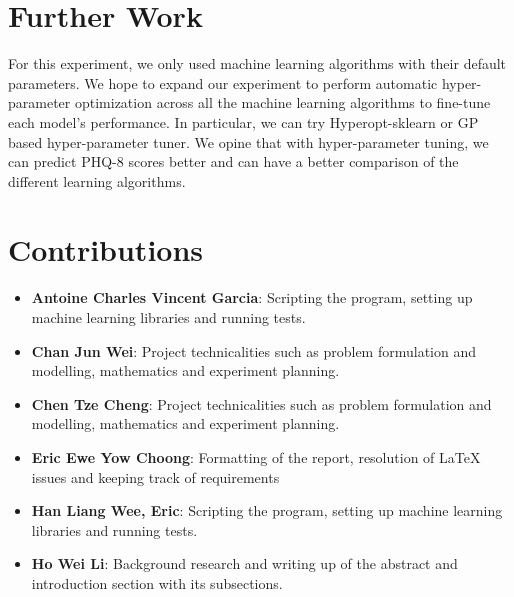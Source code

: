 \documentclass{article}
\begin{document}
	\section{Further Work}
	For this experiment, we only used machine learning algorithms with their default parameters. 
	We hope to expand our experiment to perform automatic hyper-parameter optimization across all the machine learning algorithms to fine-tune each model's performance. 
	In particular, we can try Hyperopt-sklearn \cite{Komer2014HyperoptsklearnAH} or GP based hyper-parameter tuner. 
	We opine that with hyper-parameter tuning, we can predict PHQ-8 scores better and can have a better comparison of the different learning algorithms.
	
	\section{Contributions}
	\begin{itemize}
		\item \textbf{Antoine Charles Vincent Garcia}: 
		Scripting the program, setting up machine learning libraries and running tests.
		\item \textbf{Chan Jun Wei}: 
		Project technicalities such as problem formulation and modelling, mathematics and experiment planning.
		\item \textbf{Chen Tze Cheng}: 
		Project technicalities such as problem formulation and modelling, mathematics and experiment planning.
		\item \textbf{Eric Ewe Yow Choong}: 
		Formatting of the report, resolution of LaTeX issues and keeping track of requirements
		\item \textbf{Han Liang Wee, Eric}: 
		Scripting the program, setting up machine learning libraries and running tests.
		\item \textbf{Ho Wei Li}: 
		Background research and writing up of the abstract and introduction section with its subsections. \\
	\end{itemize}
	
	
	{\scriptsize }
\end{document}
